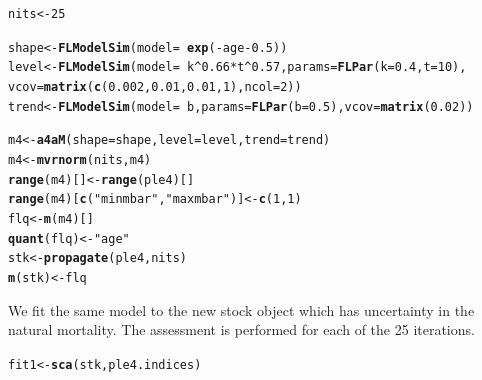 \documentclass[a4paper,english,10pt]{article}\usepackage[]{graphicx}\usepackage[]{color}
\makeatletter
\newcommand{\hlnum}[1]{\textcolor[rgb]{0.686,0.059,0.569}{#1}}%
\newcommand{\hlstr}[1]{\textcolor[rgb]{0.192,0.494,0.8}{#1}}%
\newcommand{\hlopt}[1]{\textcolor[rgb]{0,0,0}{#1}}%
\newcommand{\hlstd}[1]{\textcolor[rgb]{0.345,0.345,0.345}{#1}}%
\newcommand{\hlkwb}[1]{\textcolor[rgb]{0.69,0.353,0.396}{#1}}%
\newcommand{\hlkwc}[1]{\textcolor[rgb]{0.333,0.667,0.333}{#1}}%
\newcommand{\hlkwd}[1]{\textcolor[rgb]{0.737,0.353,0.396}{\textbf{#1}}}%
\newenvironment{kframe}{%
 \def\at@end@of@kframe{}%
 \ifinner\ifhmode%
  \def\at@end@of@kframe{\end{minipage}}%
  \begin{minipage}{\columnwidth}%
 \fi\fi%
 \def\FrameCommand##1{\hskip\@totalleftmargin \hskip-\fboxsep
 \colorbox{shadecolor}{##1}\hskip-\fboxsep
     \hskip-\linewidth \hskip-\@totalleftmargin \hskip\columnwidth}%
 \MakeFramed {\advance\hsize-\width
   \@totalleftmargin\z@ \linewidth\hsize
   \@setminipage}}%
 {\par\unskip\endMakeFramed%
 \at@end@of@kframe}
\newenvironment{knitrout}{}{} %
\makeatother
\begin{document}
\begin{knitrout}
\color{fgcolor}\begin{kframe}
\begin{alltt}
\hlstd{nits} \hlkwb{<-} \hlnum{25}

\hlstd{shape} \hlkwb{<-} \hlkwd{FLModelSim}\hlstd{(}\hlkwc{model} \hlstd{=} \hlopt{~}\hlkwd{exp}\hlstd{(}\hlopt{-}\hlstd{age} \hlopt{-} \hlnum{0.5}\hlstd{))}
\hlstd{level} \hlkwb{<-} \hlkwd{FLModelSim}\hlstd{(}\hlkwc{model} \hlstd{=} \hlopt{~}\hlstd{k}\hlopt{^}\hlnum{0.66} \hlopt{*} \hlstd{t}\hlopt{^}\hlnum{0.57}\hlstd{,} \hlkwc{params} \hlstd{=} \hlkwd{FLPar}\hlstd{(}\hlkwc{k} \hlstd{=} \hlnum{0.4}\hlstd{,} \hlkwc{t} \hlstd{=} \hlnum{10}\hlstd{),}
    \hlkwc{vcov} \hlstd{=} \hlkwd{matrix}\hlstd{(}\hlkwd{c}\hlstd{(}\hlnum{0.002}\hlstd{,} \hlnum{0.01}\hlstd{,} \hlnum{0.01}\hlstd{,} \hlnum{1}\hlstd{),} \hlkwc{ncol} \hlstd{=} \hlnum{2}\hlstd{))}
\hlstd{trend} \hlkwb{<-} \hlkwd{FLModelSim}\hlstd{(}\hlkwc{model} \hlstd{=} \hlopt{~}\hlstd{b,} \hlkwc{params} \hlstd{=} \hlkwd{FLPar}\hlstd{(}\hlkwc{b} \hlstd{=} \hlnum{0.5}\hlstd{),} \hlkwc{vcov} \hlstd{=} \hlkwd{matrix}\hlstd{(}\hlnum{0.02}\hlstd{))}

\hlstd{m4} \hlkwb{<-} \hlkwd{a4aM}\hlstd{(}\hlkwc{shape} \hlstd{= shape,} \hlkwc{level} \hlstd{= level,} \hlkwc{trend} \hlstd{= trend)}
\hlstd{m4} \hlkwb{<-} \hlkwd{mvrnorm}\hlstd{(nits, m4)}
\hlkwd{range}\hlstd{(m4)[]} \hlkwb{<-} \hlkwd{range}\hlstd{(ple4)[]}
\hlkwd{range}\hlstd{(m4)[}\hlkwd{c}\hlstd{(}\hlstr{"minmbar"}\hlstd{,} \hlstr{"maxmbar"}\hlstd{)]} \hlkwb{<-} \hlkwd{c}\hlstd{(}\hlnum{1}\hlstd{,} \hlnum{1}\hlstd{)}
\hlstd{flq} \hlkwb{<-} \hlkwd{m}\hlstd{(m4)[]}
\hlkwd{quant}\hlstd{(flq)} \hlkwb{<-} \hlstr{"age"}
\hlstd{stk} \hlkwb{<-} \hlkwd{propagate}\hlstd{(ple4, nits)}
\hlkwd{m}\hlstd{(stk)} \hlkwb{<-} \hlstd{flq}
\end{alltt}
\end{kframe}
\end{knitrout}

We fit the same model to the new stock object which has uncertainty in the natural mortality.
The assessment is performed for each of the 25 iterations.

\begin{knitrout}
\color{fgcolor}\begin{kframe}
\begin{alltt}
\hlstd{fit1} \hlkwb{<-} \hlkwd{sca}\hlstd{(stk, ple4.indices)}
\end{alltt}
\end{kframe}
\end{knitrout}
\end{document}
